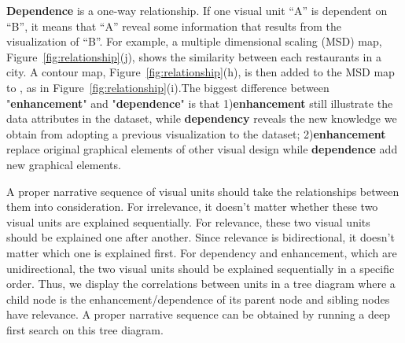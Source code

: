 \noindent
\textbf{Dependence} is a one-way relationship. If one visual unit ``A'' is dependent on ``B'', it means that ``A'' reveal some information that results from the visualization of ``B''. For example, a multiple dimensional scaling (MSD) map, Figure~\ref{fig:relationship}(j), shows the similarity between each restaurants in a city. A contour map, Figure~\ref{fig:relationship}(h), is then added to the MSD map to , as in Figure~\ref{fig:relationship}(i).The biggest difference between "\textbf{enhancement}" and "\textbf{dependence}" is that 1)\textbf{enhancement} still illustrate the data attributes in the dataset, while \textbf{dependency} reveals the new knowledge we obtain from adopting a previous visualization to the dataset; 2)\textbf{enhancement} replace original graphical elements of other visual design while \textbf{dependence} add new graphical elements.

A proper narrative sequence of visual units should take the relationships between them into consideration. For irrelevance, it doesn't matter whether these two visual units are explained sequentially. For relevance, these two visual units should be explained one after another. Since relevance is bidirectional, it doesn't matter which one is explained first. For dependency and enhancement, which are unidirectional, the two visual units should be explained sequentially in a specific order. 
 Thus, we display the correlations between units in a tree diagram where a child node is the enhancement/dependence of its parent node and sibling nodes have relevance. A proper narrative sequence can be obtained by running a deep first search on this tree diagram. 



